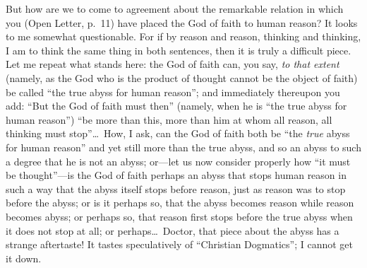 \documentclass[12pt,a4paper]{article}
\begin{document}
But how are we to come to agreement about the remarkable relation in
which you (Open Letter, p.~11) have placed the God of faith to human
reason? It looks to me somewhat questionable. For if by reason and
reason, thinking and thinking, I am to think the same thing in both
sentences, then it is truly a difficult piece. Let me repeat what
stands here: the God of faith can, you say, \emph{to that extent}
(namely, as the God who is the product of thought cannot be the
object of faith) be called ``the true abyss for human reason''; and
immediately thereupon you add: ``But the God of faith must then''
(namely, when he is ``the true abyss for human reason'') ``be more
than this, more than him at whom all reason, all thinking must
stop''\ldots\ How, I ask, can the God of faith both be ``the
\emph{true} abyss for human reason'' and yet still more than the
true abyss, and so an abyss to such a degree that he is not an
abyss; or---let us now consider properly how ``it must be
thought''---is the God of faith perhaps an abyss that stops human
reason in such a way that the abyss itself stops before reason, just
as reason was to stop before the abyss; or is it perhaps so, that
the abyss becomes reason while reason becomes abyss; or perhaps so,
that reason first stops before the true abyss when it does not stop
at all; or perhaps\ldots\ Doctor, that piece about the abyss has a
strange aftertaste! It tastes speculatively of ``Christian
Dogmatics''; I cannot get it down.
\end{document}
